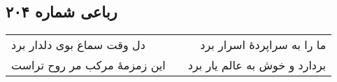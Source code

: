 \begin{center}
\section*{رباعی شماره ۲۰۴}
\label{sec:sh204}
\begin{longtable}{l p{0.5cm} r}
دل وقت سماع بوی دلدار برد
&&
ما را به سراپردهٔ اسرار برد
\\
این زمزمهٔ مرکب مر روح تراست
&&
بردارد و خوش به عالم یار برد
\\
\end{longtable}
\end{center}
